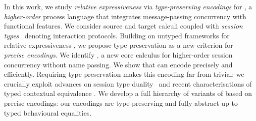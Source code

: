 \documentclass[runningheads]{llncs}
\begin{document}
In this work, we study 
{\em relative expressiveness} 
via \emph{type-preserving encodings} for \HOp, a \emph{higher-order} 
process language that integrates message-passing concurrency with functional features.
We consider source and target calculi coupled with \emph{session types}~\cite{honda.vasconcelos.kubo:language-primitives} denoting interaction protocols. 
Building on untyped frameworks for relative expressiveness
\cite{DBLP:journals/iandc/Gorla10}, 
we propose type preservation as a {new criterion} for \emph{precise encodings}.
We identify \HO, a new core calculus for higher-order session concurrency without
name passing. 
We show that \HO can encode \HOp precisely and efficiently. 
Requiring  
type preservation makes
this encoding far from trivial: we crucially exploit advances on
session type duality~\cite{TGC14,DBLP:journals/corr/abs-1202-2086} and recent
characterisations of typed contextual equivalence \cite{characteristic_bis,KouzapasPY17}.
We develop a full hierarchy of variants of \HOp based on 
precise encodings: %
our encodings are
type-preserving and fully abstract up to typed
behavioural equalities. 
\end{document}
